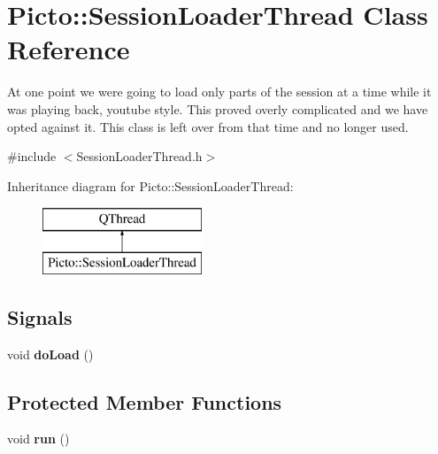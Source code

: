 \hypertarget{class_picto_1_1_session_loader_thread}{\section{Picto\-:\-:Session\-Loader\-Thread Class Reference}
\label{class_picto_1_1_session_loader_thread}
}


At one point we were going to load only parts of the session at a time while it was playing back, youtube style. This proved overly complicated and we have opted against it. This class is left over from that time and no longer used.  




{\ttfamily \#include $<$Session\-Loader\-Thread.\-h$>$}

Inheritance diagram for Picto\-:\-:Session\-Loader\-Thread\-:\begin{figure}[H]
\begin{center}
\leavevmode
\includegraphics[height=2.000000cm]{class_picto_1_1_session_loader_thread}
\end{center}
\end{figure}
\subsection*{Signals}
\begin{DoxyCompactItemize}
\item 
\hypertarget{class_picto_1_1_session_loader_thread_a1146b4c73e99912fda2f69fe6a0e5feb}{void {\bfseries do\-Load} ()}\label{class_picto_1_1_session_loader_thread_a1146b4c73e99912fda2f69fe6a0e5feb}

\end{DoxyCompactItemize}
\subsection*{Protected Member Functions}
\begin{DoxyCompactItemize}
\item 
\hypertarget{class_picto_1_1_session_loader_thread_a5a0b8502128178c227aedb6035f80560}{void {\bfseries run} ()}\label{class_picto_1_1_session_loader_thread_a5a0b8502128178c227aedb6035f80560}

\end{DoxyCompactItemize}


